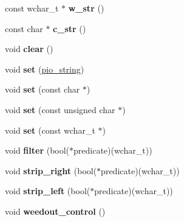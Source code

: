 \begin{DoxyCompactItemize}
\item 
\hypertarget{classpio__string_af5d0daebb8a8699c5fb5d14529aff54f}{
const wchar\_\-t $\ast$ {\bfseries w\_\-str} ()}
\label{classpio__string_af5d0daebb8a8699c5fb5d14529aff54f}

\item 
\hypertarget{classpio__string_a6db4f48d7a67a04e3bbeccf3e2e98117}{
const char $\ast$ {\bfseries c\_\-str} ()}
\label{classpio__string_a6db4f48d7a67a04e3bbeccf3e2e98117}

\item 
\hypertarget{classpio__string_a687666dc7568f47ed54b366e35ff8ea6}{
void {\bfseries clear} ()}
\label{classpio__string_a687666dc7568f47ed54b366e35ff8ea6}

\item 
\hypertarget{classpio__string_a7dee12ba039ad47865b861003b35132e}{
void {\bfseries set} (\hyperlink{classpio__string}{pio\_\-string})}
\label{classpio__string_a7dee12ba039ad47865b861003b35132e}

\item 
\hypertarget{classpio__string_abc8f32d80d811b884629ad5a95982703}{
void {\bfseries set} (const char $\ast$)}
\label{classpio__string_abc8f32d80d811b884629ad5a95982703}

\item 
\hypertarget{classpio__string_a790a5321a8fa820ecf81f5e8332dea1c}{
void {\bfseries set} (const unsigned char $\ast$)}
\label{classpio__string_a790a5321a8fa820ecf81f5e8332dea1c}

\item 
\hypertarget{classpio__string_a9fb6aa5b363de30ebfd940c2f597f323}{
void {\bfseries set} (const wchar\_\-t $\ast$)}
\label{classpio__string_a9fb6aa5b363de30ebfd940c2f597f323}

\item 
\hypertarget{classpio__string_a0178727065be3bae0d661e805fd7d3fc}{
void {\bfseries filter} (bool($\ast$predicate)(wchar\_\-t))}
\label{classpio__string_a0178727065be3bae0d661e805fd7d3fc}

\item 
\hypertarget{classpio__string_ad5e596f6881910e88ce4158ed11d82fd}{
void {\bfseries strip\_\-right} (bool($\ast$predicate)(wchar\_\-t))}
\label{classpio__string_ad5e596f6881910e88ce4158ed11d82fd}

\item 
\hypertarget{classpio__string_a1ad0a5e2b0c3ed0c97344e0f98f6d7bc}{
void {\bfseries strip\_\-left} (bool($\ast$predicate)(wchar\_\-t))}
\label{classpio__string_a1ad0a5e2b0c3ed0c97344e0f98f6d7bc}

\item 
\hypertarget{classpio__string_ad09edd9237813908fe56b3f740dcba25}{
void {\bfseries weedout\_\-control} ()}
\label{classpio__string_ad09edd9237813908fe56b3f740dcba25}

\end{DoxyCompactItemize}


